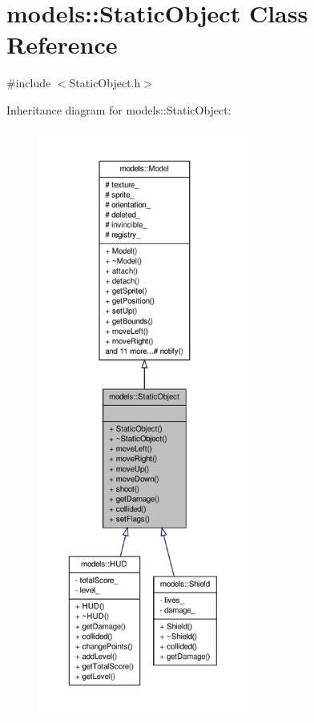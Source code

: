 \hypertarget{classmodels_1_1StaticObject}{\section{models\-:\-:\-Static\-Object \-Class \-Reference}
\label{dc/d3c/classmodels_1_1StaticObject}
}


{\ttfamily \#include $<$\-Static\-Object.\-h$>$}



\-Inheritance diagram for models\-:\-:\-Static\-Object\-:\nopagebreak
\begin{figure}[H]
\begin{center}
\leavevmode
\includegraphics[height=550pt]{d7/db1/classmodels_1_1StaticObject__inherit__graph}
\end{center}
\end{figure}


